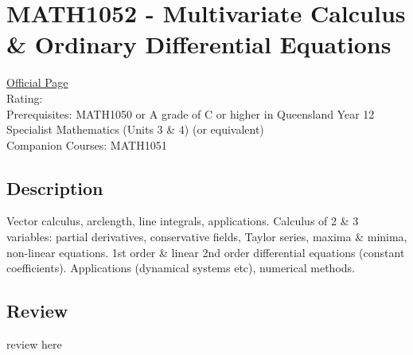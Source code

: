 \hypertarget{MATH1052}{\section{MATH1052 - Multivariate Calculus \& Ordinary Differential Equations}}

\large
\textcolor{turbo_purple}{\href{https://my.uq.edu.au/programs-courses/course.html?course_code=MATH1052}{Official Page}} \\
Rating: \cstar\cstar\cstar\cstar\ostar \\
Prerequisites: MATH1050 or A grade of C or higher in Queensland Year 12 Specialist Mathematics (Units 3 \& 4) (or equivalent) \\
Companion Courses: MATH1051

\normalsize
\subsection*{Description}
Vector calculus, arclength, line integrals, applications.
Calculus of 2 \& 3 variables: partial derivatives, conservative fields, Taylor series, maxima \& minima, non-linear equations.
1st order \& linear 2nd order differential equations (constant coefficients).
Applications (dynamical systems etc), numerical methods.

\subsection*{Review}
review here

